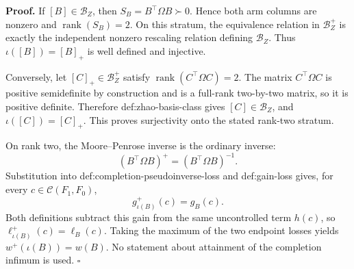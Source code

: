 \textbf{Proof.}
If \([B]\in\mathcal B_Z\), then \(S_B=B^{\top}\Omega B\succ0\).  Hence both arm columns are nonzero and \(\operatorname{rank}(S_B)=2\).  On this stratum, the equivalence relation in \(\mathcal B_Z^+\) is exactly the independent nonzero rescaling relation defining \(\mathcal B_Z\).  Thus \(\iota([B])=[B]_+\) is well defined and injective.

Conversely, let \([C]_+\in\mathcal B_Z^+\) satisfy \(\operatorname{rank}(C^{\top}\Omega C)=2\).  The matrix \(C^{\top}\Omega C\) is positive semidefinite by construction and is a full-rank two-by-two matrix, so it is positive definite.  Therefore def:zhao-basis-class gives \([C]\in\mathcal B_Z\), and \(\iota([C])=[C]_+\).  This proves surjectivity onto the stated rank-two stratum.

On rank two, the Moore--Penrose inverse is the ordinary inverse:
\[
(B^{\top}\Omega B)^+=(B^{\top}\Omega B)^{-1}.
\]
Substitution into def:completion-pseudoinverse-loss and def:gain-loss gives, for every \(c\in\mathcal C(F_1,F_0)\),
\[
g_{\iota(B)}^+(c)=g_B(c).
\]
Both definitions subtract this gain from the same uncontrolled term \(h(c)\), so \(\ell_{\iota(B)}^+(c)=\ell_B(c)\).  Taking the maximum of the two endpoint losses yields \(w^+(\iota(B))=w(B)\).  No statement about attainment of the completion infimum is used. \(\square\)